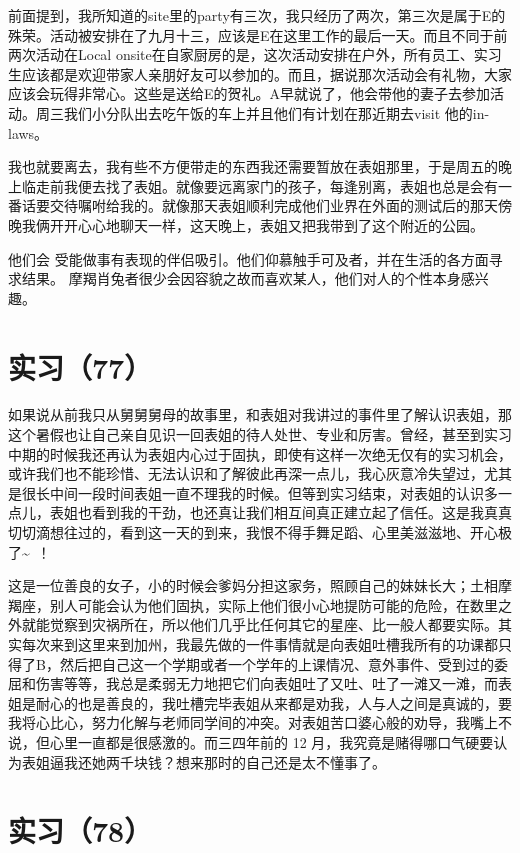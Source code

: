 \documentclass[12pt]{book}
\begin{document}
前面提到，我所知道的site里的party有三次，我只经历了两次，第三次是属于E的殊荣。活动被安排在了九月十三，应该是E在这里工作的最后一天。而且不同于前两次活动在Local onsite在自家厨房的是，这次活动安排在户外，所有员工、实习生应该都是欢迎带家人亲朋好友可以参加的。而且，据说那次活动会有礼物，大家应该会玩得非常心。这些是送给E的贺礼。A早就说了，他会带他的妻子去参加活动。周三我们小分队出去吃午饭的车上并且他们有计划在那近期去visit 他的in-laws。

我也就要离去，我有些不方便带走的东西我还需要暂放在表姐那里，于是周五的晚上临走前我便去找了表姐。就像要远离家门的孩子，每逢别离，表姐也总是会有一番话要交待嘱咐给我的。就像那天表姐顺利完成他们业界在外面的测试后的那天傍晚我俩开开心心地聊天一样，这天晚上，表姐又把我带到了这个附近的公园。

他们会 受能做事有表现的伴侣吸引。他们仰慕触手可及者，并在生活的各方面寻求结果。 摩羯肖兔者很少会因容貌之故而喜欢某人，他们对人的个性本身感兴趣。

\section{实习（77）　}
\label{sec-5-80}

如果说从前我只从舅舅舅母的故事里，和表姐对我讲过的事件里了解认识表姐，那这个暑假也让自己亲自见识一回表姐的待人处世、专业和厉害。曾经，甚至到实习中期的时候我还再认为表姐内心过于固执，即使有这样一次绝无仅有的实习机会，或许我们也不能珍惜、无法认识和了解彼此再深一点儿，我心灰意冷失望过，尤其是很长中间一段时间表姐一直不理我的时候。但等到实习结束，对表姐的认识多一点儿，表姐也看到我的干劲，也还真让我们相互间真正建立起了信任。这是我真真切切滴想往过的，看到这一天的到来，我恨不得手舞足蹈、心里美滋滋地、开心极了\textasciitilde{}~！

这是一位善良的女子，小的时候会爹妈分担这家务，照顾自己的妹妹长大；土相摩羯座，别人可能会认为他们固执，实际上他们很小心地提防可能的危险，在数里之外就能觉察到灾祸所在，所以他们几乎比任何其它的星座、比一般人都要实际。其实每次来到这里来到加州，我最先做的一件事情就是向表姐吐槽我所有的功课都只得了B，然后把自己这一个学期或者一个学年的上课情况、意外事件、受到过的委屈和伤害等等，我总是柔弱无力地把它们向表姐吐了又吐、吐了一滩又一滩，而表姐是耐心的也是善良的，我吐槽完毕表姐从来都是劝我，人与人之间是真诚的，要我将心比心，努力化解与老师同学间的冲突。对表姐苦口婆心般的劝导，我嘴上不说，但心里一直都是很感激的。而三四年前的 12 月，我究竟是赌得哪口气硬要认为表姐逼我还她两千块钱？想来那时的自己还是太不懂事了。　

\section{实习（78）　}
\label{sec-5-81}
\end{document}
